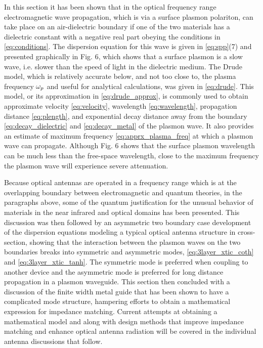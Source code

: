 \documentclass[11pt]{article}
\begin{document}
In this section it has been shown that in the optical frequency range electromagnetic wave propagation, which is via a surface plasmon polariton, can take place on an air-dielectric boundary if one of the two materials has a dielectric constant with a negative real part obeying the conditions in \eqref{eq:conditions}. The dispersion equation for this wave is given in \eqref{eq:spp}(7) and presented graphically in Fig. 6, which shows that a surface plasmon is a slow wave, i.e. slower than the speed of light in the dielectric medium. The Drude model, which is relatively accurate below, and not too close to, the plasma frequency $\omega_p$ and useful for analytical calculations, was given in \eqref{eq:drude}. This model, or its approximation in \eqref{eq:drude_approx}, is commonly used to obtain approximate velocity \eqref{eq:velocity}, wavelength \eqref{eq:wavelength}, propagation distance \eqref{eq:plength}, and exponential decay distance away from the boundary \eqref{eq:decay_dielectric} and
\eqref{eq:decay_metal} of the plasmon wave. It also provides an estimate of maximum frequency \eqref{eq:apprx_plasma_freq} at which a plasmon wave can propagate. Although Fig. 6 shows that the surface plasmon wavelength can be much less than the free-space wavelength, close to the maximum frequency the plasmon wave will experience severe attenuation.

Because optical antennas are operated in a frequency range which is at the overlapping boundary between electromagnetic and quantum theories, in the paragraphs above, some of the quantum justification for the unusual behavior of materials in the near infrared and optical domains has been presented. This discussion was then followed by an asymmetric two boundary case development of the dispersion equations modeling a typical optical antenna structure in cross-section, showing that the interaction between the plasmon waves on the two boundaries breaks into symmetric and asymmetric modes, \eqref{eq:3layer_xtic_coth} and \eqref{eq:3layer_xtic_tanh}. The symmetric mode is preferred when coupling to another device and the asymmetric mode is preferred for long distance propagation in a plasmon waveguide. This section then concluded with a discussion of the finite width metal guide that has been shown to have a complicated mode structure, hampering efforts to obtain a mathematical expression for impedance matching. Current attempts at obtaining a mathematical model and along with design methods that improve impedance matching and enhance optical antenna radiation will be covered in the individual antenna discussions that follow.
\end{document}
